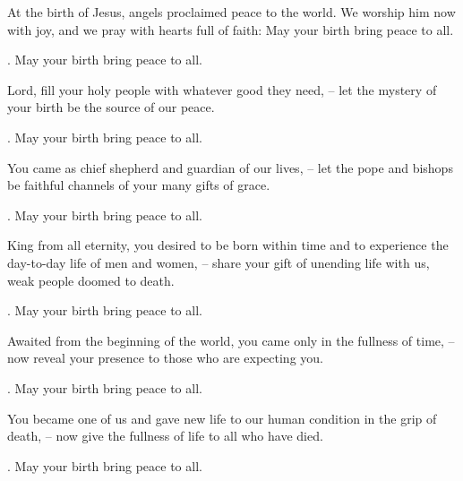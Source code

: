\lettrine[loversize=0.15,lines=2]{A}{}t the birth of Jesus, angels proclaimed peace to the world. We worship him now with joy, and we pray with hearts full of faith: May your birth bring peace to all.
\par \Rbar. May your birth bring peace to all.

Lord, fill your holy people with whatever good they need,
– let the mystery of your birth be the source of our peace.
\par \Rbar. May your birth bring peace to all.

You came as chief shepherd and guardian of our lives,
– let the pope and bishops be faithful channels of your many gifts of grace.
\par \Rbar. May your birth bring peace to all.

King from all eternity, you desired to be born within time and to experience the day-to-day life of men and women,
– share your gift of unending life with us, weak people doomed to death.
\par \Rbar. May your birth bring peace to all.

Awaited from the beginning of the world, you came only in the fullness of time,
– now reveal your presence to those who are expecting you.
\par \Rbar. May your birth bring peace to all.

You became one of us and gave new life to our human condition in the grip of death,
– now give the fullness of life to all who have died.
\par \Rbar. May your birth bring peace to all.